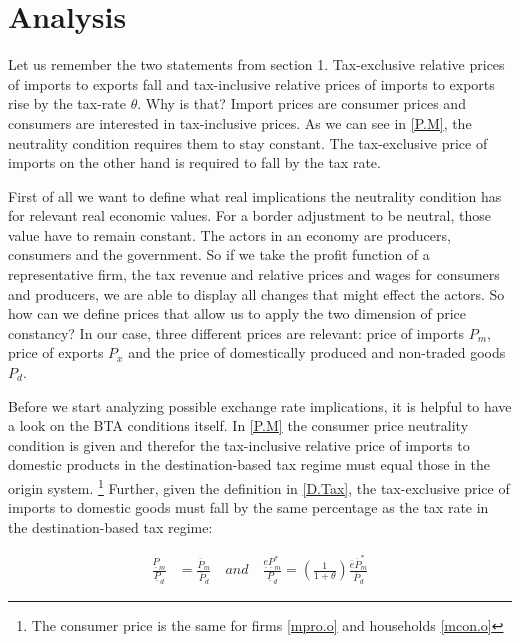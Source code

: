 \section{Analysis}
Let us remember the two statements from section 1. Tax-exclusive relative prices of imports to exports fall and tax-inclusive relative prices of imports to exports rise by the tax-rate $\theta$. Why is that? Import prices are consumer prices and consumers are interested in tax-inclusive prices. As we can see in \eqref{P.M}, the neutrality condition requires them to stay constant. The tax-exclusive price of imports on the other hand is required to fall by the tax rate. 

First of all we want to define what real implications the neutrality condition has for relevant real economic values. For a border adjustment to be neutral, those value have to remain constant. The actors in an economy are producers, consumers and the government. So if we take the profit function of a representative firm, the tax revenue and relative prices and wages for consumers and producers, we are able to display all changes that might effect the actors. 
So how can we define prices that allow us to apply the two dimension of price constancy? In our case, three different prices are relevant: price of imports $P_m$, price of exports $P_x$ and the price of domestically produced and non-traded goods $P_d$. 




Before we start analyzing possible exchange rate implications, it is helpful to have a look on the BTA conditions itself. In \eqref{P.M} the consumer price neutrality condition is given and therefor the tax-inclusive relative price of imports to domestic products in the destination-based tax regime must equal those in the origin system. \footnote{The consumer price is the same for firms \eqref{mpro.o} and households \eqref{mcon.o}} Further, given the definition in \eqref{D.Tax}, the tax-exclusive price of imports to domestic goods must fall by the same percentage as the tax rate in the destination-based tax regime: 



\begin{equation}\label{mtod}
\begin{aligned}
\frac{\underline P_m}{\underline P_d} &= \frac{\overline P_m}{\overline P_d} \quad and \quad \frac{\underline e \underline P_m^*}{\underline P_d} =  \left( \frac{1}{1+\theta} \right) \frac{\overline e \overline P^*_m}{\overline P_d}
\end{aligned}
\end{equation}

